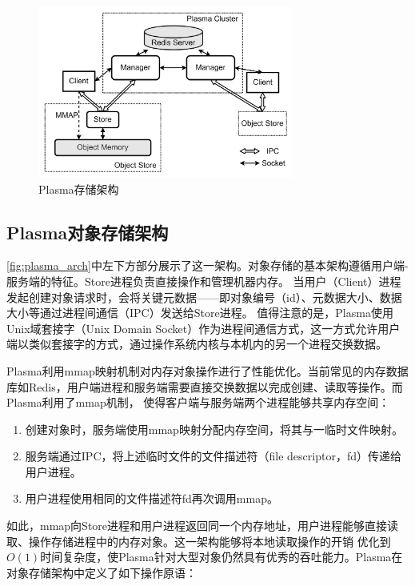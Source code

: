 \begin{figure}[h] 
    \centering
    \includegraphics[width=0.75\textwidth]{image/chap02/plasma_arch.png}
    \caption{Plasma存储架构}
    \label{fig:plasma_arch}
\end{figure}

\subsection{Plasma对象存储架构}

\autoref{fig:plasma_arch}中左下方部分展示了这一架构。对象存储的基本架构遵循用户端-服务端的特征。Store进程负责直接操作和管理机器内存。
当用户（Client）进程发起创建对象请求时，会将关键元数据——即对象编号（id）、元数据大小、数据大小等通过进程间通信（IPC）发送给Store进程。
值得注意的是，Plasma使用Unix域套接字（Unix Domain Socket）作为进程间通信方式，这一方式允许用户端以类似套接字的方式，通过操作系统内核与本机内的另一个进程交换数据。

Plasma利用mmap映射机制对内存对象操作进行了性能优化。当前常见的内存数据库如Redis，用户端进程和服务端需要直接交换数据以完成创建、读取等操作。而Plasma利用了mmap机制，
使得客户端与服务端两个进程能够共享内存空间：

\begin{enumerate}
    \item 创建对象时，服务端使用mmap映射分配内存空间，将其与一临时文件映射。
    \item 服务端通过IPC，将上述临时文件的文件描述符（file descriptor，fd）传递给用户进程。
    \item 用户进程使用相同的文件描述符fd再次调用mmap。
\end{enumerate}

如此，mmap向Store进程和用户进程返回同一个内存地址，用户进程能够直接读取、操作存储进程中的内存对象。这一架构能够将本地读取操作的开销
优化到$O(1)$时间复杂度，使Plasma针对大型对象仍然具有优秀的吞吐能力。Plasma在对象存储架构中定义了如下操作原语：

